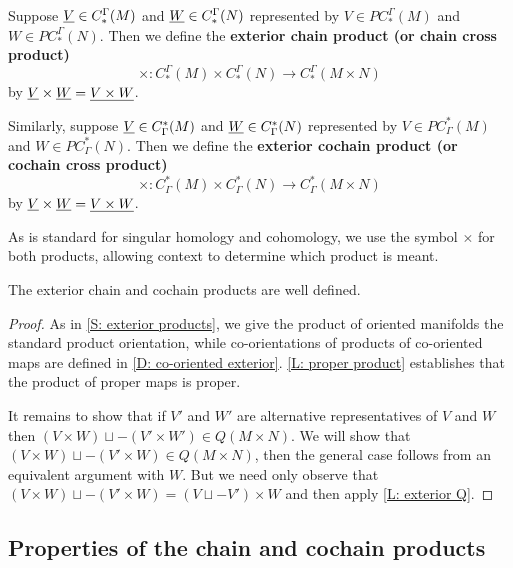 \begin{definition}\label{D: exterior chain}
	Suppose $\underline{V} \in C_*^{\Gamma}(M)$ and $\underline{W} \in C_*^{\Gamma}(N)$ represented by $V \in PC_*^{\Gamma}(M)$ and $W \in PC_*^{\Gamma}(N)$. Then we define the \textbf{exterior chain product (or chain cross product)} $$\times: C_*^{\Gamma}(M) \times C_*^{\Gamma}(N) \to C_*^{\Gamma}(M \times N)$$ by $\underline{V} \times \underline{W} = \underline{V \times W}$.

	Similarly, suppose $\underline{V} \in C^*_{\Gamma}(M)$ and $\underline{W} \in C^*_{\Gamma}(N)$ represented by $V \in PC^*_{\Gamma}(M)$ and $W \in PC^*_{\Gamma}(N)$. Then we define the \textbf{exterior cochain product (or cochain cross product)} $$\times: C^*_{\Gamma}(M) \times C^*_{\Gamma}(N) \to C^*_{\Gamma}(M \times N)$$ by $\underline{V} \times \underline{W} = \underline{V \times W}$.
\end{definition}

As is standard for singular homology and cohomology, we use the symbol $\times$ for both products, allowing context to determine which product is meant.

\begin{proposition}
The exterior chain and cochain products are well defined.
\end{proposition}
\begin{proof}
As in \cref{S: exterior products}, we give the product of oriented manifolds the standard product orientation, while co-orientations of products of co-oriented maps are defined in \cref{D: co-oriented exterior}. \cref{L: proper product} establishes that the product of proper maps is proper.

It remains to show that if $V'$ and $W'$ are alternative representatives of $V$ and $W$ then $(V \times W)\sqcup -(V' \times W') \in Q(M \times N)$. We will show that $(V \times W)\sqcup -(V' \times W) \in Q(M \times N)$, then the general case follows from an equivalent argument with $W$. But we need only observe that $(V \times W)\sqcup -(V' \times W) = (V\sqcup -V') \times W$ and then apply
\cref{L: exterior Q}.
\end{proof}





\subsection{Properties of the chain and cochain products}\label{S: (co)chain properties}




